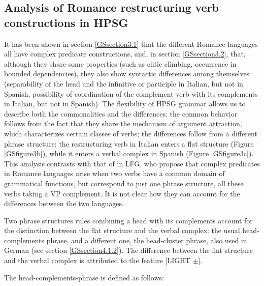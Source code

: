 \documentclass[output=paper]{langsci/langscibook}
\begin{document}
{\subsection{Analysis of Romance restructuring verb constructions in HPSG} \label{GSsection3.3}

It has been shown in section \ref{GSsection3.1} that the different Romance languages all have complex predicate constructions, and, in section \ref{GSsection3.2}, that, although they share some properties (such as clitic climbing, occurrence in bounded dependencies), they also show syntactic differences among themselves (separability of the head and the infinitive or participle in Italian, but not in Spanish, possibility of coordination of the complement verb with its complements in Italian, but not in Spanish). The flexibility of HPSG grammar allows us to describe both the commonalities and the differences: the common behavior follows from the fact that they share the mechanism of argument attraction, which characterizes certain classes of verbs; the differences follow from a different phrase structure: the restructuring verb in Italian enters a flat structure (Figure \ref{GSfigure3b}), while it enters a verbal complex in Spanish (Figure \ref{GSfigure3c}). This analysis contrasts with that of \cite{andrews1999complex} in LFG, who propose that complex predicates in Romance languages arise when two verbs have a common domain of grammatical functions, but correspond to just one phrase structure, all these verbs taking a VP complement. It is not clear how they can account for the differences between the two languages.

Two phrase structures rules combining a head with its complements account for the distinction between the flat structure and the verbal complex: the usual head-complements phrase, and a different one, the head-cluster phrase, also used in German (see section \ref{GSsection4.1.2}). The difference between the flat structure and the verbal complex is attributed to the feature [LIGHT $\pm$]. 

The head-complements-phrase is defined as follows:

\begin{exe}
\end{exe}


}
\end{document}
